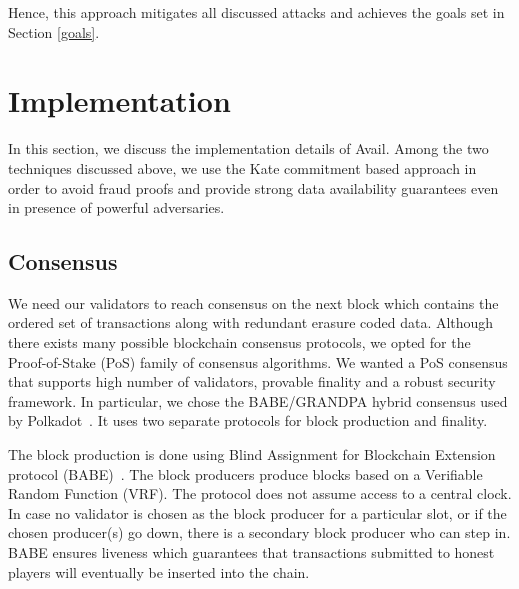 \documentclass[sigconf, screen=true, nonacm]{acmart}
\begin{document}
        Hence, this approach mitigates all discussed attacks and achieves the goals set in Section \ref{goals}.
        
\section{Implementation}
    In this section, we discuss the implementation details of Avail. Among the two techniques discussed above, we use the Kate commitment based approach in order to avoid fraud proofs and provide strong data availability guarantees even in presence of powerful adversaries. 

    \subsection{Consensus}
        We need our validators to reach consensus on the next block which contains the ordered set of transactions along with redundant erasure coded data. 
        Although there exists many possible blockchain consensus protocols, we opted for the  Proof-of-Stake (PoS) family of consensus algorithms. We wanted a PoS consensus that supports high number of validators, provable finality and a robust security framework. In particular, we chose the BABE/GRANDPA hybrid consensus used by Polkadot~\cite{polkadot_consensus:2020}. It uses two separate protocols for block production and finality.
        
        The block production is done using Blind Assignment for Blockchain Extension protocol (BABE)~\cite{BABE:2020}. The block producers produce blocks based on a Verifiable Random Function (VRF). The protocol does not assume access to a central clock. In case no validator is chosen as the block producer for a particular slot, or if the chosen producer(s) go down, there is a secondary block producer who can step in. BABE ensures liveness which guarantees that transactions submitted to honest players will eventually be inserted into the chain. 
        
\end{document}
